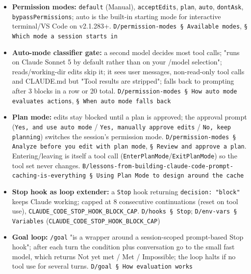 \begin{itemize}
\item \textbf{Permission modes:} \texttt{default} (Manual), \texttt{acceptEdits}, \texttt{plan}, \texttt{auto}, \texttt{dontAsk}, \texttt{bypassPermissions}; auto is the built-in starting mode for interactive terminal/VS Code on v2.1.283+. \texttt{D/\allowbreak{}permission-\allowbreak{}modes § Available modes}, \texttt{§ Which mode a session starts in}
\item \textbf{Auto-mode classifier gate:} a second model decides most tool calls; "runs on Claude Sonnet 5 by default rather than on your /model selection"; reads/working-dir edits skip it; it sees user messages, non-read-only tool calls and CLAUDE.md but "Tool results are stripped"; falls back to prompting after 3 blocks in a row or 20 total. \texttt{D/\allowbreak{}permission-\allowbreak{}modes § How auto mode evaluates actions}, \texttt{§ When auto mode falls back}
\item \textbf{Plan mode:} edits stay blocked until a plan is approved; the approval prompt (\texttt{Yes, and use auto mode} / \texttt{Yes, manually approve edits} / \texttt{No, keep planning}) switches the session's permission mode. \texttt{D/\allowbreak{}permission-\allowbreak{}modes § Analyze before you edit with plan mode}, \texttt{§ Review and approve a plan}. Entering/leaving is itself a tool call (\texttt{EnterPlanMode}/\texttt{ExitPlanMode}) so the tool set never changes. \texttt{B/\allowbreak{}lessons-\allowbreak{}from-\allowbreak{}building-\allowbreak{}claude-\allowbreak{}code-\allowbreak{}prompt-\allowbreak{}caching-\allowbreak{}is-\allowbreak{}everything § Using Plan Mode to design around the cache}
\item \textbf{Stop hook as loop extender:} a \texttt{Stop} hook returning \texttt{decision:\allowbreak{} "block"} keeps Claude working; capped at 8 consecutive continuations (reset on tool use), \texttt{CLAUDE\_\allowbreak{}CODE\_\allowbreak{}STOP\_\allowbreak{}HOOK\_\allowbreak{}BLOCK\_\allowbreak{}CAP}. \texttt{D/\allowbreak{}hooks § Stop}; \texttt{D/\allowbreak{}env-\allowbreak{}vars § Variables} (\texttt{CLAUDE\_\allowbreak{}CODE\_\allowbreak{}STOP\_\allowbreak{}HOOK\_\allowbreak{}BLOCK\_\allowbreak{}CAP})
\item \textbf{Goal loop:} \texttt{/\allowbreak{}goal} "is a wrapper around a session-scoped prompt-based Stop hook"; after each turn the condition plus conversation go to the small fast model, which returns Not yet met / Met / Impossible; the loop halts if no tool use for several turns. \texttt{D/\allowbreak{}goal § How evaluation works}

\end{itemize}
